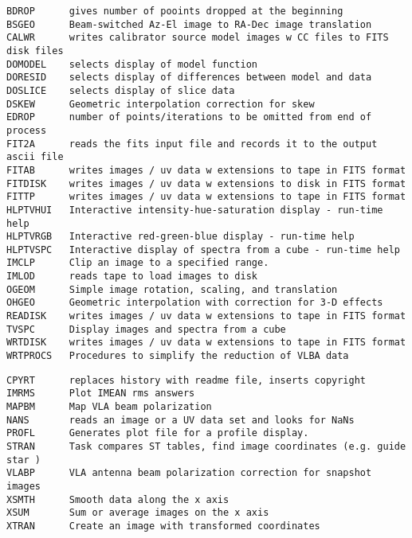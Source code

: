 \vskip 0.5pt
\bbve\begin{verbatim}
BDROP      gives number of pooints dropped at the beginning
BSGEO      Beam-switched Az-El image to RA-Dec image translation
CALWR      writes calibrator source model images w CC files to FITS disk files
DOMODEL    selects display of model function
DORESID    selects display of differences between model and data
DOSLICE    selects display of slice data
DSKEW      Geometric interpolation correction for skew
EDROP      number of points/iterations to be omitted from end of process
FIT2A      reads the fits input file and records it to the output ascii file
FITAB      writes images / uv data w extensions to tape in FITS format
FITDISK    writes images / uv data w extensions to disk in FITS format
FITTP      writes images / uv data w extensions to tape in FITS format
HLPTVHUI   Interactive intensity-hue-saturation display - run-time help
HLPTVRGB   Interactive red-green-blue display - run-time help
HLPTVSPC   Interactive display of spectra from a cube - run-time help
IMCLP      Clip an image to a specified range.
IMLOD      reads tape to load images to disk
OGEOM      Simple image rotation, scaling, and translation
OHGEO      Geometric interpolation with correction for 3-D effects
READISK    writes images / uv data w extensions to tape in FITS format
TVSPC      Display images and spectra from a cube
WRTDISK    writes images / uv data w extensions to tape in FITS format
WRTPROCS   Procedures to simplify the reduction of VLBA data
\end{verbatim}\eve


\vskip 0.5pt
\bbve\begin{verbatim}
CPYRT      replaces history with readme file, inserts copyright
IMRMS      Plot IMEAN rms answers
MAPBM      Map VLA beam polarization
NANS       reads an image or a UV data set and looks for NaNs
PROFL      Generates plot file for a profile display.
STRAN      Task compares ST tables, find image coordinates (e.g. guide star )
VLABP      VLA antenna beam polarization correction for snapshot images
XSMTH      Smooth data along the x axis
XSUM       Sum or average images on the x axis
XTRAN      Create an image with transformed coordinates
\end{verbatim}\eve


